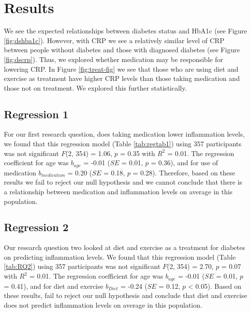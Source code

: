 \documentclass[
  man]{apa6}
\begin{document}
\hypertarget{results}{%
\section{Results}\label{results}}

We see the expected relationships between diabetes status and HbA1c (see Figure \ref{fig:dshba1c}). However, with CRP we see a relatively similar level of CRP between people without diabetes and those with diagnosed diabetes (see Figure \ref{fig:dscrp}). Thus, we explored whether medication may be responsible for lowering CRP. In Figure \ref{fig:treat-fig} we see that those who are using diet and exercise as treatment have higher CRP levels than those taking medication and those not on treatment. We explored this further statistically.

\hypertarget{regression-1}{%
\subsection{Regression 1}\label{regression-1}}

For our first research question, does taking medication lower inflammation levels, we found that this regression model (Table \ref{tab:regtab1}) using 357 participants was not significant \(F\)(2, 354) = 1.06, \(p\) = 0.35 with \(R^2\) = 0.01. The regression coefficient for age was \(b_{age}\) = -0.01 (\(SE\) = 0.01, \(p\) = 0.36), and for use of medication \(b_{medication}\) = 0.20 (\(SE\) = 0.18, \(p\) = 0.28). Therefore, based on these results we fail to reject our null hypothesis and we cannot conclude that there is a relationship between medication and inflammation levels on average in this population.

\hypertarget{regression-2}{%
\subsection{Regression 2}\label{regression-2}}

Our research question two looked at diet and exercise as a treatment for diabetes on predicting inflammation levels. We found that this regression model (Table \ref{tab:RQ2}) using 357 participants was not significant \(F\)(2, 354) = 2.70, \(p\) = 0.07 with \(R^2\) = 0.01. The regression coefficient for age was \(b_{age}\) = -0.01 (\(SE\) = 0.01, \(p\) = 0.41), and for diet and exercise \(b_{Diet}\) = -0.24 (\(SE\) = 0.12, \(p\) \textless{} 0.05). Based on these results, fail to reject our null hypothesis and conclude that diet and exercise does not predict inflammation levels on average in this population.
\end{document}
